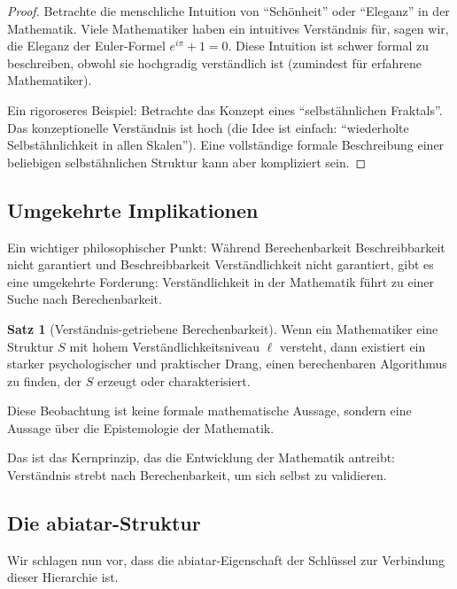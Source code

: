 \documentclass[a4paper,12pt]{article}
\theoremstyle{definition}
\newtheorem{satz}{Satz}
\begin{document}
\begin{proof}
Betrachte die menschliche Intuition von ``Schönheit'' oder ``Eleganz'' in der Mathematik. Viele Mathematiker haben ein intuitives Verständnis für, sagen wir, die Eleganz der Euler-Formel $e^{i\pi} + 1 = 0$. Diese Intuition ist schwer formal zu beschreiben, obwohl sie hochgradig verständlich ist (zumindest für erfahrene Mathematiker).

Ein rigoroseres Beispiel: Betrachte das Konzept eines ``selbstähnlichen Fraktals''. Das konzeptionelle Verständnis ist hoch (die Idee ist einfach: ``wiederholte Selbstähnlichkeit in allen Skalen''). Eine vollständige formale Beschreibung einer beliebigen selbstähnlichen Struktur kann aber kompliziert sein.
\end{proof}

\subsection{Umgekehrte Implikationen}

Ein wichtiger philosophischer Punkt: Während Berechenbarkeit Beschreibbarkeit nicht garantiert und Beschreibbarkeit Verständlichkeit nicht garantiert, gibt es eine umgekehrte Forderung: Verständlichkeit in der Mathematik führt zu einer Suche nach Berechenbarkeit.

\begin{satz}[Verständnis-getriebene Berechenbarkeit]
Wenn ein Mathematiker eine Struktur $S$ mit hohem Verständlichkeitsniveau $\ell$ versteht, dann existiert ein starker psychologischer und praktischer Drang, einen berechenbaren Algorithmus zu finden, der $S$ erzeugt oder charakterisiert.

Diese Beobachtung ist keine formale mathematische Aussage, sondern eine Aussage über die Epistemologie der Mathematik.
\end{satz}

Das ist das Kernprinzip, das die Entwicklung der Mathematik antreibt: Verständnis strebt nach Berechenbarkeit, um sich selbst zu validieren.

\subsection{Die abiatar-Struktur}

Wir schlagen nun vor, dass die abiatar-Eigenschaft der Schlüssel zur Verbindung dieser Hierarchie ist.
\end{document}
